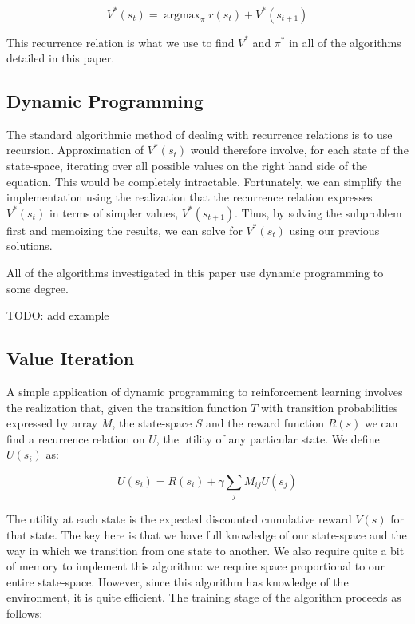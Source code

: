 \documentclass[12pt, letterpaper]{article}
\DeclareMathOperator*{\argmax}{argmax}
\begin{document}
\begin{equation}
    V^*(s_t) = \argmax_\pi r(s_t) + V^*(s_{t+1}) 
\end{equation}

This recurrence relation is what we use to find $V^*$ and $\pi^*$ in all of the algorithms detailed in this paper.

\subsection{Dynamic Programming}

The standard algorithmic method of dealing with recurrence relations is to use recursion. Approximation of $V^*(s_t)$ would therefore involve, for each state of the state-space, iterating over all possible values on the right hand side of the equation. This would be completely intractable. Fortunately, we can simplify the implementation using the realization that the recurrence relation expresses $V^*(s_t)$ in terms of simpler values, $V^*(s_{t+1})$. Thus, by solving the subproblem first and memoizing the results, we can solve for $V^*(s_t)$ using our previous solutions. 

All of the algorithms investigated in this paper use dynamic programming to some degree. 

TODO: add example

\subsection{Value Iteration}

A simple application of dynamic programming to reinforcement learning involves the realization that, given the transition function $T$ with transition probabilities expressed by array $M$, the state-space $S$ and the reward function $R(s)$ we can find a recurrence relation on $U$, the utility of any particular state. We define $U(s_i)$ as:

\begin{equation}
    U(s_i) = R(s_i) + \gamma \sum_j M_{ij} U(s_j)
\end{equation}

The utility at each state is the expected discounted cumulative reward $V(s)$ for that state. The key here is that we have full knowledge of our state-space and the way in which we transition from one state to another. We also require quite a bit of memory to implement this algorithm: we require space proportional to our entire state-space. However, since this algorithm has knowledge of the environment, it is quite efficient. The training stage of the algorithm proceeds as follows:
\end{document}
